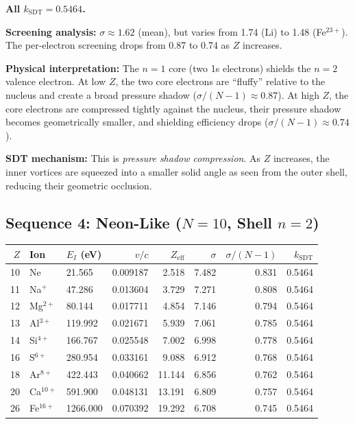 \textbf{All $k_{\text{SDT}} = 0.5464$.}

\textbf{Screening analysis:} $\sigma \approx 1.62$ (mean), but varies from 1.74 (Li) to 1.48 (Fe$^{23+}$).  The per-electron screening drops from 0.87 to 0.74 as $Z$ increases.

\textbf{Physical interpretation:} The $n = 1$ core (two 1s electrons) shields the $n = 2$ valence electron.  At low $Z$, the two core electrons are ``fluffy'' relative to the nucleus and create a broad pressure shadow ($\sigma/(N{-}1) \approx 0.87$).  At high $Z$, the core electrons are compressed tightly against the nucleus, their pressure shadow becomes geometrically smaller, and shielding efficiency drops ($\sigma/(N{-}1) \approx 0.74$).

\textbf{SDT mechanism:} This is \emph{pressure shadow compression}.  As $Z$ increases, the inner vortices are squeezed into a smaller solid angle as seen from the outer shell, reducing their geometric occlusion.


\subsection{Sequence 4: Neon-Like ($N = 10$, Shell $n = 2$)}

\begin{center}
\small
\begin{tabular}{rllrrrrr}
\hline
$Z$ & Ion & $E_I$ (eV) & $v/c$ & $Z_{\text{eff}}$ & $\sigma$ & $\sigma/(N{-}1)$ & $k_{\text{SDT}}$ \\
\hline
10 & Ne          &   21.565 & 0.009187 &  2.518 &  7.482 & 0.831 & 0.5464 \\
11 & Na$^+$      &   47.286 & 0.013604 &  3.729 &  7.271 & 0.808 & 0.5464 \\
12 & Mg$^{2+}$   &   80.144 & 0.017711 &  4.854 &  7.146 & 0.794 & 0.5464 \\
13 & Al$^{3+}$   &  119.992 & 0.021671 &  5.939 &  7.061 & 0.785 & 0.5464 \\
14 & Si$^{4+}$   &  166.767 & 0.025548 &  7.002 &  6.998 & 0.778 & 0.5464 \\
16 & S$^{6+}$    &  280.954 & 0.033161 &  9.088 &  6.912 & 0.768 & 0.5464 \\
18 & Ar$^{8+}$   &  422.443 & 0.040662 & 11.144 &  6.856 & 0.762 & 0.5464 \\
20 & Ca$^{10+}$  &  591.900 & 0.048131 & 13.191 &  6.809 & 0.757 & 0.5464 \\
26 & Fe$^{16+}$  & 1266.000 & 0.070392 & 19.292 &  6.708 & 0.745 & 0.5464 \\
\hline
\end{tabular}
\end{center}


